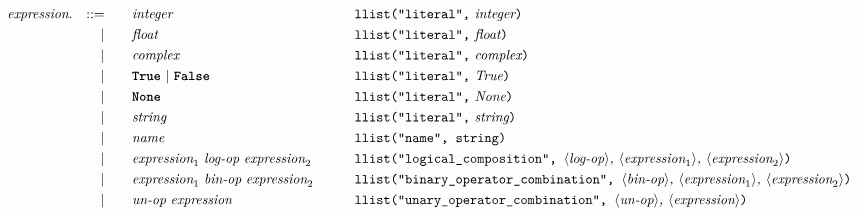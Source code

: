 \begin{alignat*}{9}
  && \textit{expression}.  && ::= &\quad && \textit{integer} 
                                                            && \texttt{llist("literal",}\ \textit{integer}\texttt{)}     \\
  &&                       && |   &\quad && \textit{float}
                                                            && \texttt{llist("literal",}\ \textit{float}\texttt{)}       \\
  &&                       && |   &\quad && \textit{complex}
                                                            && \texttt{llist("literal",}\ \textit{complex}\texttt{)}     \\
  &&                       && |   &\quad && \term{True}\ |\ \term{False}
                                                            && \texttt{llist("literal",}\ \textit{True}\texttt{)}        \\
  &&                       && |   &\quad && \term{None}
                                                            && \texttt{llist("literal",}\ \textit{None}\texttt{)}        \\
  &&                       && |   &\quad && \textit{string}
                                                            && \texttt{llist("literal",}\ \textit{string}\texttt{)}      \\
  &&                       && |   &\quad && \textit{name}
                                                            && \texttt{llist("name", string)}                            \\
  &&                       && |   &\quad && \textit{expression}_1 \  \textit{log-op} \ \textit{expression}_2 \qquad
                                                            && \texttt{llist("logical\_composition",  } \langle \textit{log-op}\rangle \textit{, } \langle \textit{expression}_1\rangle \textit{, } \langle \textit{expression}_2\rangle \texttt{)}          \\
  &&                       && |   &\quad && \textit{expression}_1 \  \textit{bin-op} \ \textit{expression}_2 \qquad
                                                            && \texttt{llist("binary\_operator\_combination",  } \langle \textit{bin-op}\rangle \textit{, } \langle \textit{expression}_1\rangle \textit{, } \langle \textit{expression}_2\rangle \texttt{)} \\
  &&                       && |   &\quad && \textit{un-op} \ \textit{expression}
                                                            && \texttt{llist("unary\_operator\_combination",  } \langle \textit{un-op}\rangle \textit{, } \langle \textit{expression}\rangle \texttt{)}                                                      \\

\end{alignat*}

